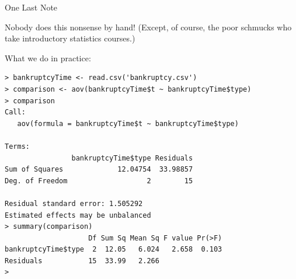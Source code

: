 \begin{frame}[fragile]{One Last Note}

  Nobody does this nonsense by hand! (Except, of course, the poor
  schmucks who take introductory statistics courses.)

  \vfill

  What we do in practice:

 {
   \fontsize{5pt}{5pt}
   \selectfont

\begin{verbatim}
> bankruptcyTime <- read.csv('bankruptcy.csv')
> comparison <- aov(bankruptcyTime$t ~ bankruptcyTime$type)
> comparison
Call:
   aov(formula = bankruptcyTime$t ~ bankruptcyTime$type)

Terms:
                bankruptcyTime$type Residuals
Sum of Squares             12.04754  33.98857
Deg. of Freedom                   2        15

Residual standard error: 1.505292
Estimated effects may be unbalanced
> summary(comparison)
                    Df Sum Sq Mean Sq F value Pr(>F)
bankruptcyTime$type  2  12.05   6.024   2.658  0.103
Residuals           15  33.99   2.266               
>
\end{verbatim}
}
 

 
\end{frame}

